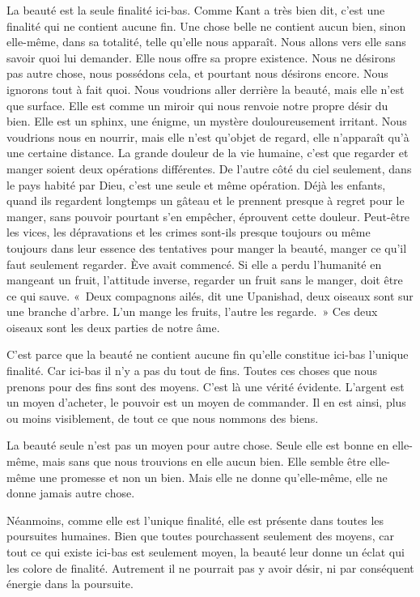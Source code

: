\documentclass[french,twoside]{book} %
\begin{document}
La beauté est la seule finalité ici-bas. Comme Kant a très bien dit, c'est une finalité qui ne contient aucune fin. Une chose belle ne contient aucun bien, sinon elle-même, dans sa totalité, telle qu'elle nous apparaît. Nous allons vers elle sans savoir quoi lui demander. Elle nous offre sa propre existence. Nous ne désirons pas autre chose, nous possédons cela, et pourtant nous désirons encore. Nous ignorons tout à fait quoi. Nous voudrions aller derrière la beauté, mais elle n'est que surface. Elle est comme un miroir qui nous renvoie notre propre désir du bien. Elle est un sphinx, une énigme, un mystère douloureusement irritant. Nous voudrions nous en nourrir, mais elle n'est qu'objet de regard, elle n'apparaît qu'à une certaine distance. La grande douleur de la vie humaine, c'est que regarder et manger soient deux opérations différentes. De l'autre côté du ciel seulement, dans le pays habité par Dieu, c'est une seule et même opération. Déjà les enfants, quand ils regardent longtemps un gâteau et le prennent presque à regret pour le manger, sans pouvoir pourtant s'en empêcher, éprouvent cette douleur. Peut-être les vices, les dépravations et les crimes sont-ils presque toujours ou même toujours dans leur essence des tentatives pour manger la beauté, manger ce qu'il faut seulement regarder. Ève avait commencé. Si elle a perdu l'humanité en mangeant un fruit, l'attitude inverse, regarder un fruit sans le manger, doit être ce qui sauve. « Deux compagnons ailés, dit une Upanishad, deux oiseaux sont sur une branche d'arbre. L'un mange les fruits, l'autre les regarde. » Ces deux oiseaux sont les deux parties de notre âme.\par
C'est parce que la beauté ne contient aucune fin qu'elle constitue ici-bas l'unique finalité. Car ici-bas il n'y a pas du tout de fins. Toutes ces choses que nous prenons pour des fins sont des moyens. C'est là une vérité évidente. L'argent est un moyen d'acheter, le pouvoir est un moyen de commander. Il en est ainsi, plus ou moins visiblement, de tout ce que nous nommons des biens.\par
La beauté seule n'est pas un moyen pour autre chose. Seule elle est bonne en elle-même, mais sans que nous trouvions en elle aucun bien. Elle semble être elle-même une promesse et non un bien. Mais elle ne donne qu'elle-même, elle ne donne jamais autre chose.\par
Néanmoins, comme elle est l'unique finalité, elle est présente dans toutes les poursuites humaines. Bien que toutes pourchassent seulement des moyens, car tout ce qui existe ici-bas est seulement moyen, la beauté leur donne un éclat qui les colore de finalité. Autrement il ne pourrait pas y avoir désir, ni par conséquent énergie dans la poursuite.\par
\end{document}
